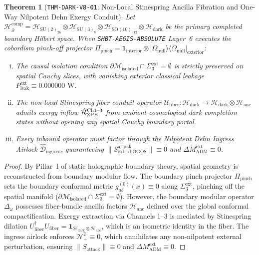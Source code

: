 \documentclass[11pt,onecolumn]{article}
\newtheorem{theorem}{Theorem}
\begin{document}
\begin{theorem}[\texttt{THM-DARK-V8-01}: Non-Local Stinespring Ancilla Fibration and One-Way Nilpotent Dehn Exergy Conduit]
\label{thm:dark_v8_01}
Let $\mathcal{H}_{\partial}^{\text{comp}} = \mathcal{H}_{\text{SU}(2)_{26}} \otimes \mathcal{H}_{\text{SU}(3)_8} \otimes \mathcal{H}_{\text{SO}(10)_{312}} \otimes \mathcal{H}_{\text{dark}}$ be the primary completed boundary Hilbert space. When \texttt{SHBT-AEGIS-ABSOLUTE} Layer~6 executes the cobordism pinch-off projector $\Pi_{\text{pinch}} = \mathbf{1}_{\text{interior}} \otimes |\Omega_{\text{null}}\rangle\langle\Omega_{\text{null}}|_{\text{exterior}}$:
\begin{enumerate}[(i)]
    \item The causal isolation condition $\partial\mathcal{M}_{\text{isolated}} \cap \Sigma_3^{\text{ext}} = \emptyset$ is strictly preserved on spatial Cauchy slices, with vanishing exterior classical leakage $P_{\text{leak}}^{\text{ext}} \equiv 0.000000\text{ W}$.
    \item The non-local Stinespring fiber conduit operator $\mathcal{U}_{\text{fiber}}: \mathcal{H}_{\text{dark}} \to \mathcal{H}_{\text{dark}} \otimes \mathcal{H}_{\text{anc}}$ admits exergy inflow $\hat{\mathcal{R}}_{\text{ZPE}}^{\text{Ch1\text{--}3}}$ from ambient cosmological dark-completion states without opening any spatial Cauchy boundary portal.
    \item Every inbound operator must factor through the Nilpotent Dehn Ingress Airlock $\hat{\mathcal{D}}_{\text{ingress}}$, guaranteeing $\|S_{\text{ext}\to\text{LOGOS}}^{\text{attack}}\| \equiv 0$ and $\Delta M_{\text{ADM}}^{\text{ext}} \equiv 0$.
\end{enumerate}
\end{theorem}

\begin{proof}
By Pillar~I of static holographic boundary theory, spatial geometry is reconstructed from boundary modular flow. The boundary pinch projector $\Pi_{\text{pinch}}$ sets the boundary conformal metric $g_{ab}^{(0)}(x) \equiv 0$ along $\Sigma_3^{\text{ext}}$, pinching off the spatial manifold ($\partial\mathcal{M}_{\text{isolated}} \cap \Sigma_3^{\text{ext}} = \emptyset$). However, the boundary modular operator $\Delta_\omega$ possesses fiber-bundle ancilla factors $\mathcal{H}_{\text{anc}}$ defined over the global conformal compactification. Exergy extraction via Channels 1--3 is mediated by Stinespring dilation $U_{\text{fiber}}^\dagger U_{\text{fiber}} = \mathbf{1}_{\mathcal{H}_{\text{dark}} \otimes \mathcal{H}_{\text{anc}}}$, which is an isometric identity in the fiber. The ingress airlock enforces $\mathcal{N}_+^2 \equiv 0$, which annihilates any non-nilpotent external perturbation, ensuring $\|S_{\text{attack}}\| \equiv 0$ and $\Delta M_{\text{ADM}}^{\text{ext}} \equiv 0$.
\end{proof}
\end{document}
